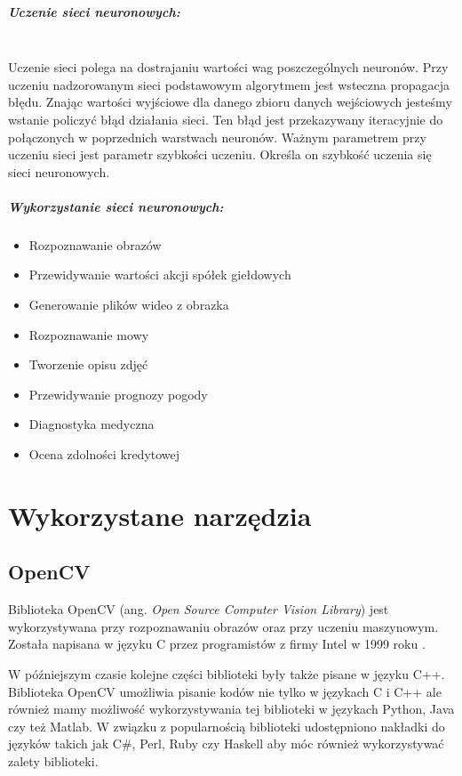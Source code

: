 \documentclass[a4paper,12pt,twoside,openany]{report}
\begin{document}
\paragraph{Uczenie sieci neuronowych:}
\mbox{} \\
\indent
Uczenie sieci polega na dostrajaniu wartości wag poszczególnych neuronów. Przy uczeniu nadzorowanym sieci podstawowym algorytmem jest wsteczna propagacja błędu. Znając wartości wyjściowe dla danego zbioru danych wejściowych jesteśmy wstanie policzyć błąd działania sieci. Ten błąd jest przekazywany iteracyjnie do połączonych w poprzednich warstwach neuronów. Ważnym parametrem przy uczeniu sieci jest parametr szybkości uczeniu. Określa on szybkość uczenia się sieci neuronowych. 

\paragraph{Wykorzystanie sieci neuronowych:}
\begin{itemize}
	\item Rozpoznawanie obrazów
	\item Przewidywanie wartości akcji spółek giełdowych
	\item Generowanie plików wideo z obrazka
	\item Rozpoznawanie mowy
	\item Tworzenie opisu zdjęć
	\item Przewidywanie prognozy pogody
	\item Diagnostyka medyczna
	\item Ocena zdolności kredytowej
\end{itemize}

\chapter{Wykorzystane narzędzia}

\section{OpenCV}
Biblioteka OpenCV (ang.\textit{ Open Source Computer Vision Library}) jest wykorzystywana przy rozpoznawaniu obrazów oraz przy uczeniu maszynowym. Została napisana w języku C przez programistów z firmy Intel w 1999 roku \cite{opencv}.

W późniejszym czasie kolejne części biblioteki były także pisane w języku C++. Biblioteka OpenCV umożliwia pisanie kodów nie tylko w językach C i C++ ale również mamy możliwość wykorzystywania tej biblioteki w językach Python, Java czy też Matlab. W związku z popularnością biblioteki udostępniono nakładki do języków takich jak C\#, Perl, Ruby czy Haskell aby móc również wykorzystywać zalety  biblioteki\cite{opencv2}. 
\end{document}
